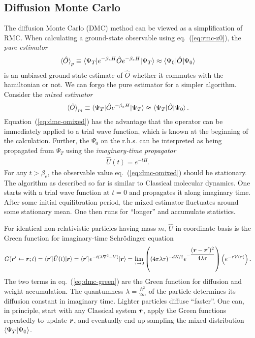 \subsection{Diffusion Monte Carlo}
The diffusion Monte Carlo (DMC) method can be viewed as a simplification of RMC.
When calculating a ground-state observable using eq.~(\ref{eq:rmc-z0}), the \emph{pure estimator}
\begin{align} \label{eq:dmc-opure}
\braket{\hat{O}}_p \equiv \braket{\Psi_T|e^{-\beta_e H}\hat{O}e^{-\beta_e H}|\Psi_T} \approx \braket{\Psi_0|\hat{O}|\Psi_0}
\end{align}
is an unbiased ground-state estimate of $\hat{O}$ whether it commutes with the hamiltonian or not. We can forgo the pure estimator for a simpler algorithm. Consider the \emph{mixed estimator}
\begin{align} \label{eq:dmc-omixed}
\braket{\hat{O}}_m \equiv \braket{\Psi_T|\hat{O}e^{-\beta_e H}|\Psi_T}\approx\braket{\Psi_T|\hat{O}|\Psi_0}.
\end{align}
Equation~(\ref{eq:dmc-omixed}) has the advantage that the operator can be immediately applied to a trial wave function, which is known at the beginning of the calculation. Further, the $\Psi_0$ on the r.h.s. can be interpreted as being propagated from $\Psi_T$ using the \emph{imaginary-time propagator}
\begin{align}
\hat{U}(t) = e^{-t H}.
\end{align}
For any $t>\beta_e$, the observable value eq.~(\ref{eq:dmc-omixed}) should be stationary. The algorithm as described so far is similar to Classical molecular dynamics. One starts with a trial wave function at $t=0$ and propagates it along imaginary time. After some initial equilibration period, the mixed estimator fluctuates around some stationary mean. One then runs for ``longer'' and accumulate statistics.

For identical non-relativistic particles having mass $m$, $\hat{U}$ in coordinate basis is the Green function for imaginary-time Schr\"odinger equation
\begin{align}
G(\boldsymbol{r}'\leftarrow\boldsymbol{r};t) = \braket{\boldsymbol{r}'|\hat{U}(t)|\boldsymbol{r}} =  \braket{\boldsymbol{r}'|e^{-t(\lambda \nabla^2+V)}|\boldsymbol{r}} = \lim\limits_{\tau\rightarrow 0}
\left(
(4\pi\lambda\tau)^{-dN/2}e^{-\dfrac{(\boldsymbol{r}-\boldsymbol{r}')^2}{4\lambda\tau}}
\right)
\left(
e^{-\tau V(\boldsymbol{r})}
\right). \label{eq:dmc-green}
\end{align}
The two terms in eq.~(\ref{eq:dmc-green}) are the Green function for diffusion and weight accumulation.
The quantumness $\lambda=\frac{\hbar^2}{2m}$ of the particle determines its diffusion constant in imaginary time. Lighter particles diffuse ``faster''. One can, in principle, start with any Classical system $\boldsymbol{r}$, apply the Green functions repeatedly to update $\boldsymbol{r}$, and eventually end up sampling the mixed distribution $\braket{\Psi_T|\Psi_0}$.

